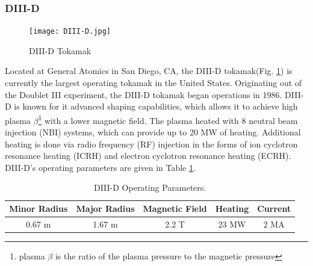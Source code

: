 \subsubsection{DIII-D}
\begin{figure}[ht]
    \centering
    \texttt{[image: DIII-D.jpg]}
    \caption{DIII-D Tokamak}
    \label{fig:d3d}
\end{figure}
Located at General Atomics in San Diego, CA, the DIII-D tokamak(Fig. \ref{fig:d3d}) is currently the largest operating tokamak in the United States\cite{luxon2002design}.
Originating out of the Doublet III experiment, the DIII-D tokamak began operations in 1986. DIII-D is known for it advanced shaping capabilities, which allows it to achieve high plasma $\beta$\footnote{plasma $\beta$ is the ratio of the plasma pressure to the magnetic pressure} with a lower magnetic field. The plasma heated with 8 neutral beam injection (NBI) systems, which can provide up to 20 MW of heating. Additional heating is done via radio frequency (RF) injection in the forms of ion cyclotron resonance heating (ICRH) and electron cyclotron resonance heating (ECRH). DIII-D's operating parameters are given in Table \ref{tab:d3d}.
\begin{table}[h!]
    \centering
    \caption{DIII-D Operating Parameters\cite{luxon2002design}.}
    \label{tab:d3d}
    \begin{tabular}{ccccc}
        \textbf{Minor Radius} & \textbf{Major Radius} & \textbf{Magnetic Field} & \textbf{Heating} & \textbf{Current} \\ \hline \hline
        0.67 m & 1.67 m & 2.2 T & 23 MW & 2 MA \\ \hline
    \end{tabular}
\end{table}

